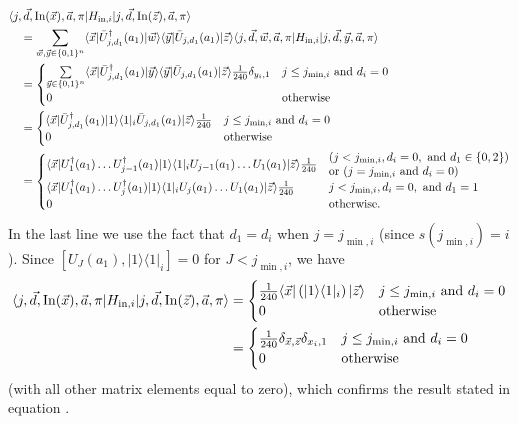 \documentclass[../thesis-main/thesis-main]{subfiles}
\begin{document}
\begin{align}
 & \langle j,\vec{d},\operatorname{In}(\vec{x}),\vec{a},\pi|H_{{\text{in}},i}|j,\vec{d},\operatorname{In}(\vec{z}),\vec{a},\pi\rangle\\
 & \quad =\sum_{\vec{w},\vec{y}\in\{0,1\}^{n}}\langle\vec{x}|\bar{U}_{j,d_1}^{\dagger}(a_{1})|\vec{w}\rangle\langle\vec{y}|\bar{U}_{j,d_1}(a_{1})|\vec{z}\rangle\langle j,\vec{d},\vec{w},\vec{a},\pi|H_{{\text{in}},i}|j,\vec{d},\vec{y},\vec{a},\pi\rangle\\
 &\quad = \begin{cases}
\underset{\vec{y}\in\{0,1\}^{n}}{\sum}\langle\vec{x}|\bar{U}_{j,d_1}^{\dagger}(a_{1})|\vec{y}\rangle\langle\vec{y}|\bar{U}_{j,d_1}(a_{1})|\vec{z}\rangle\frac{1}{240}\delta_{y_{i},1} & j\leq j_{\min,i}\text{ and }d_{i}=0\\
0 & \text{otherwise}
\end{cases}\\
 &\quad =\begin{cases}
\langle\vec{x}|\bar{U}_{j,d_1}^{\dagger}(a_{1})|1\rangle\langle1|_{i}\bar{U}_{j,d_1}(a_{1})|\vec{z}\rangle\frac{1}{240} & j\leq j_{\min,i}\text{ and }d_{i}=0\\
0 & \text{otherwise}
\end{cases}\\
 &\quad =\begin{cases}
\langle\vec{x}|U_1^{\dagger}(a_1)\ldots U_{j-1}^{\dagger}(a_1)|1\rangle\langle1|_{i}U_{j-1}(a_1)\ldots U_{1}(a_1)|\vec{z}\rangle\frac{1}{240} & \begin{aligned}
&(j< j_{\min,i}, d_{i}=0, \text{ and } d_1\in\{0,2\})\\
&\text{or } (j= j_{\min,i}\text{ and }d_{i}=0)
\end{aligned}\\
\langle\vec{x}|U_1^{\dagger}(a_1)\ldots U_{j}^{\dagger}(a_1)|1\rangle\langle1|_{i}U_{j}(a_1)\ldots U_{1}(a_1)|\vec{z}\rangle\frac{1}{240} & j< j_{\min,i}, d_{i}=0, \text{ and } d_1=1\\
0 & \text{otherwise.}
\end{cases}
\end{align}
In the last line we use the fact that $d_1=d_i$ when $j=j_{\min,i}$ (since $s(j_{\min,i})=i$). Since $[U_{J}(a_{1}),|1\rangle\langle1|_{i}]=0$ for $J<j_{\min,i}$, we have
\begin{align}
\langle j,\vec{d},\operatorname{In}(\vec{x}),\vec{a},\pi|H_{{\text{in}},i}|j,\vec{d},\operatorname{In}(\vec{z}),\vec{a},\pi\rangle & =\begin{cases}
\frac{1}{240}\langle\vec{x}|\left(|1\rangle\langle1|_{i}\right)|\vec{z}\rangle & j\leq j_{\min,i}\text{ and }d_{i}=0\\
0 & \text{otherwise}
\end{cases}\label{eq:mat_els_Hinj}\\
 & =\begin{cases}
\frac{1}{240}\delta_{\vec{x},\vec{z}}\delta_{x_{i},1} & j\leq j_{\min,i}\text{ and }d_{i}=0\\
0 & \text{otherwise}
\end{cases}
\end{align}
(with all other matrix elements equal to zero), which confirms the result stated in equation .
\end{document}
